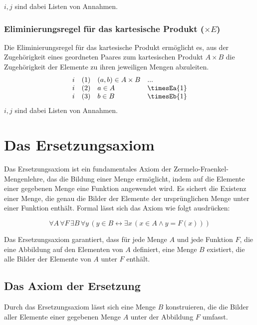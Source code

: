 \documentclass{book}
\theoremstyle{plain}
\theoremstyle{remark}
\theoremstyle{definition}
\begin{document}
\(i,j\) sind dabei Listen von Annahmen.

\subsubsection*{Eliminierungsregel für das kartesische Produkt ($\times E$)}
\label{rule:timesEa}\label{rule:timesEb}
Die Eliminierungsregel für das kartesische Produkt ermöglicht es, aus der Zugehörigkeit eines geordneten Paares zum kartesischen Produkt $A \times B$ die Zugehörigkeit der Elemente zu ihren jeweiligen Mengen abzuleiten.
\[
\begin{array}{llll}
	i & (1) & (a, b) \in A \times B & ... \\
	i & (2) & a \in A & \timesEa{1} \\
	i & (3) & b \in B & \timesEb{1} \\
\end{array}
\]
\(i,j\) sind dabei Listen von Annahmen.

\section{Das Ersetzungsaxiom}

Das Ersetzungsaxiom ist ein fundamentales Axiom der Zermelo-Fraenkel-Mengenlehre, das die Bildung einer Menge ermöglicht, indem auf die Elemente einer gegebenen Menge eine Funktion angewendet wird. Es sichert die Existenz einer Menge, die genau die Bilder der Elemente der ursprünglichen Menge unter einer Funktion enthält. Formal lässt sich das Axiom wie folgt ausdrücken:

\label{Ersetzungsaxiom}
\[
\forall A \, \forall F \, \exists B \, \forall y \, \left( y \in B \leftrightarrow \exists x \, (x \in A \land y = F(x)) \right)
\]

Das Ersetzungsaxiom garantiert, dass für jede Menge \( A \) und jede Funktion \( F \), die eine Abbildung auf den Elementen von \( A \) definiert, eine Menge \( B \) existiert, die alle Bilder der Elemente von \( A \) unter \( F \) enthält.

\subsection{Das Axiom der Ersetzung}

Durch das Ersetzungsaxiom lässt sich eine Menge \( B \) konstruieren, die die Bilder aller Elemente einer gegebenen Menge \( A \) unter der Abbildung \( F \) umfasst.
\end{document}

